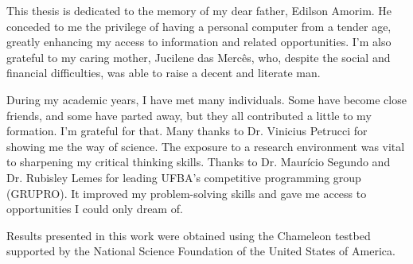 This thesis is dedicated to the memory of my dear father, Edilson Amorim. He conceded to me the privilege of having a personal computer from a tender age, greatly enhancing my access to information and related opportunities. I'm also grateful to my caring mother, Jucilene das Mercês, who, despite the social and financial difficulties, was able to raise a decent and literate man.

During my academic years, I have met many individuals. Some have become close friends, and some have parted away, but they all contributed a little to my formation. I'm grateful for that. Many thanks to Dr. Vinicius Petrucci for showing me the way of science. The exposure to a research environment was vital to sharpening my critical thinking skills. Thanks to Dr. Maurício Segundo and Dr. Rubisley Lemes for leading UFBA's competitive programming group (GRUPRO). It improved my problem-solving skills and gave me access to opportunities I could only dream of.

Results presented in this work were obtained using the Chameleon testbed supported by the National Science Foundation of the United States of America.
